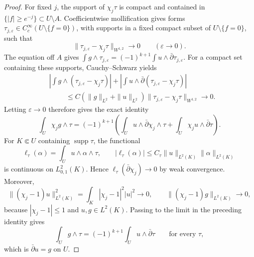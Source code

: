 \documentclass[11pt,reqno]{amsart}
\numberwithin{equation}{section}
\theoremstyle{definition}
\theoremstyle{remark}
\begin{document}
\begin{proof}
For fixed $j$, the support of $\chi_j\tau$ is compact and contained
in $\{|f|\ge e^{-j}\}\subset U\setminus A$.  Coefficientwise
mollification gives forms
$\tau_{j,\varepsilon}\in C_c^\infty(U\setminus\{f=0\})$, with
supports in a fixed compact subset of $U\setminus\{f=0\}$, such that
\[
 \|\tau_{j,\varepsilon}-\chi_j\tau\|_{W^{1,2}}\longrightarrow0
 \qquad(\varepsilon\to0).
\]
The equation off $A$ gives
$\int g\wedge\tau_{j,\varepsilon}
 =(-1)^{k+1}\int u\wedge\bar\partial\tau_{j,\varepsilon}$.
For a compact set containing these supports, Cauchy--Schwarz yields
\[
 \begin{split}
 &\left|\int g\wedge(\tau_{j,\varepsilon}-\chi_j\tau)\right|
 +\left|\int u\wedge
       \bar\partial(\tau_{j,\varepsilon}-\chi_j\tau)\right|\\
 &\hspace{1cm}\le
 C(\|g\|_{L^2}+\|u\|_{L^2})
   \|\tau_{j,\varepsilon}-\chi_j\tau\|_{W^{1,2}}
 \longrightarrow0 .
 \end{split}
\]
Letting $\varepsilon\to0$ therefore gives the exact identity
\[
 \int_U\chi_jg\wedge\tau
 =(-1)^{k+1}\left(
    \int_Uu\wedge\bar\partial\chi_j\wedge\tau
      +\int_U\chi_ju\wedge\bar\partial\tau\right).
\]
For $K\Subset U$ containing $\operatorname{supp}\tau$, the functional
\[
 \ell_\tau(\alpha)=\int_Uu\wedge\alpha\wedge\tau,\qquad
 |\ell_\tau(\alpha)|
       \le C_\tau\|u\|_{L^2(K)}\|\alpha\|_{L^2(K)}
\]
is continuous on $L^2_{0,1}(K)$.  Hence
$\ell_\tau(\bar\partial\chi_j)\to0$ by weak convergence.  Moreover,
\[
 \|(\chi_j-1)u\|_{L^2(K)}^2
   =\int_K|\chi_j-1|^2|u|^2\longrightarrow0,\qquad
 \|(\chi_j-1)g\|_{L^2(K)}\longrightarrow0,
\]
because $|\chi_j-1|\le1$ and $u,g\in L^2(K)$.
Passing to the limit in the preceding identity gives
\[
 \int_Ug\wedge\tau=(-1)^{k+1}\int_Uu\wedge\bar\partial\tau
 \qquad\text{for every }\tau,
\]
which is $\bar\partial u=g$ on $U$.
\end{proof}
\end{document}
